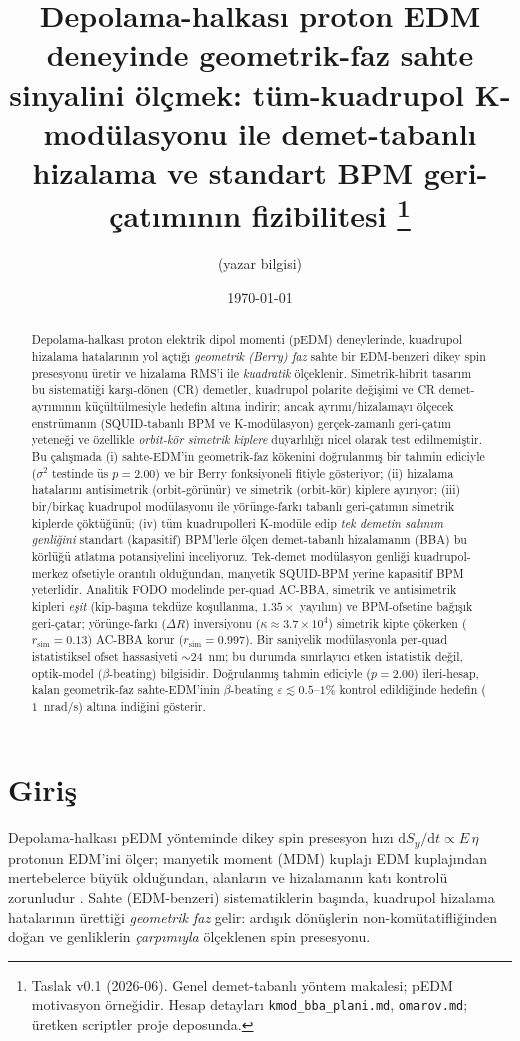 \documentclass[twocolumn,a4paper,10pt]{article}
\title{\bfseries Depolama-halkası proton EDM deneyinde geometrik-faz sahte
sinyalini ölçmek: tüm-kuadrupol K-modülasyonu ile demet-tabanlı hizalama ve
standart BPM geri-çatımının fizibilitesi%
\thanks{Taslak v0.1 (2026-06). Genel demet-tabanlı yöntem makalesi; pEDM
motivasyon örneğidir. Hesap detayları \texttt{kmod\_bba\_plani.md},
\texttt{omarov.md}; üretken scriptler proje deposunda.}}
\author{(yazar bilgisi)}
\date{\today}
\begin{document}
\maketitle

\begin{abstract}
Depolama-halkası proton elektrik dipol momenti (pEDM) deneylerinde, kuadrupol
hizalama hatalarının yol açtığı \emph{geometrik (Berry) faz} sahte bir
EDM-benzeri dikey spin presesyonu üretir ve hizalama RMS'i ile \emph{kuadratik}
ölçeklenir. Simetrik-hibrit tasarım \cite{omarov2022} bu sistematiği
karşı-dönen (CR) demetler, kuadrupol polarite değişimi ve CR demet-ayrımının
küçültülmesiyle hedefin altına indirir; ancak ayrımı/hizalamayı ölçecek
enstrümanın (SQUID-tabanlı BPM ve K-modülasyon) gerçek-zamanlı geri-çatım
yeteneği ve özellikle \emph{orbit-kör simetrik kiplere} duyarlılığı nicel olarak
test edilmemiştir. Bu çalışmada (i) sahte-EDM'in geometrik-faz kökenini
doğrulanmış bir tahmin ediciyle ($\sigma^2$ testinde üs $p=2.00$) ve bir Berry
fonksiyoneli fitiyle gösteriyor; (ii) hizalama hatalarını antisimetrik
(orbit-görünür) ve simetrik (orbit-kör) kiplere ayırıyor; (iii) bir/birkaç
kuadrupol modülasyonu ile yörünge-farkı tabanlı geri-çatımın simetrik kiplerde
çöktüğünü; (iv) tüm kuadrupolleri K-modüle edip \emph{tek demetin salınım
genliğini} standart (kapasitif) BPM'lerle ölçen demet-tabanlı hizalamanın (BBA)
bu körlüğü atlatma potansiyelini inceliyoruz. Tek-demet modülasyon genliği
kuadrupol-merkez ofsetiyle orantılı olduğundan, manyetik SQUID-BPM yerine
kapasitif BPM yeterlidir. Analitik FODO modelinde per-quad AC-BBA, simetrik ve
antisimetrik kipleri \emph{eşit} (kip-başına tekdüze koşullanma, $1.35\times$
yayılım) ve BPM-ofsetine bağışık geri-çatar; yörünge-farkı ($\Delta R$)
inversiyonu ($\kappa \approx 3.7\times10^4$) simetrik kipte çökerken
($r_\mathrm{sim}=0.13$) AC-BBA korur ($r_\mathrm{sim}=0.997$). Bir saniyelik
modülasyonla per-quad istatistiksel ofset hassasiyeti $\sim$24~nm; bu durumda
sınırlayıcı etken istatistik değil, optik-model ($\beta$-beating) bilgisidir.
Doğrulanmış tahmin ediciyle ($p=2.00$) ileri-hesap, kalan geometrik-faz
sahte-EDM'inin $\beta$-beating $\varepsilon \lesssim 0.5$--$1\%$ kontrol
edildiğinde hedefin ($1$~nrad/s) altına indiğini gösterir.
\end{abstract}

\section{Giriş}
\label{sec:intro}
Depolama-halkası pEDM yönteminde dikey spin presesyon hızı
$\mathrm{d}S_y/\mathrm{d}t \propto E\,\eta$ protonun EDM'ini ölçer; manyetik
moment (MDM) kuplajı EDM kuplajından mertebelerce büyük olduğundan, alanların ve
hizalamanın katı kontrolü zorunludur \cite{omarov2022,anastassopoulos2016}.
Sahte (EDM-benzeri) sistematiklerin başında, kuadrupol hizalama hatalarının
ürettiği \emph{geometrik faz} gelir: ardışık dönüşlerin non-komütatifliğinden
doğan ve genliklerin \emph{çarpımıyla} ölçeklenen spin presesyonu.
\end{document}
